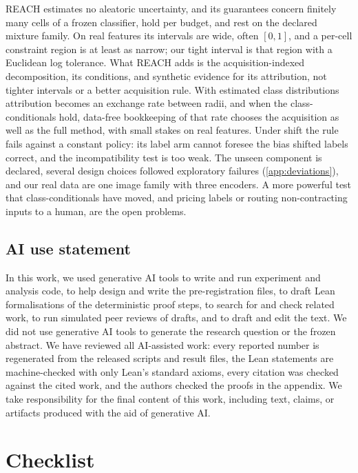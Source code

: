 \documentclass[twoside]{article}
\begin{document}
REACH estimates no aleatoric uncertainty, and its guarantees concern finitely many cells of a frozen
classifier, hold per budget, and rest on the declared mixture family. On real features its intervals are
wide, often $[0,1]$, and a per-cell constraint region is at least as narrow; our tight interval is that
region with a Euclidean log tolerance. What REACH adds is the acquisition-indexed decomposition, its
conditions, and synthetic evidence for its attribution, not tighter intervals or a better acquisition
rule. With estimated class distributions attribution becomes an exchange rate between radii, and when the
class-conditionals hold, data-free bookkeeping of that rate chooses the acquisition as well as the full
method, with small stakes on real features. Under shift the rule fails against a constant policy: its
label arm cannot foresee the bias shifted labels correct, and the incompatibility test is too weak. The
unseen component is declared, several design choices followed exploratory failures
(\cref{app:deviations}), and our real data are one image family with three encoders. A more powerful test
that class-conditionals have moved, and pricing labels or routing non-contracting inputs to a human, are
the open problems.

\subsection*{AI use statement}
In this work, we used generative AI tools to write and run experiment and analysis code, to help design
and write the pre-registration files, to draft Lean formalisations of the deterministic proof steps, to
search for and check related work, to run simulated peer reviews of drafts, and to draft and edit the text.
We did not use generative AI tools to generate the research question or the frozen abstract. We have
reviewed all AI-assisted work: every reported number is regenerated from the released scripts and result
files, the Lean statements are machine-checked with only Lean's standard axioms, every citation was checked
against the cited work, and the authors checked the proofs in the appendix. We take responsibility for the
final content of this work, including text, claims, or artifacts produced with the aid of generative AI.




\section*{Checklist}
\end{document}
